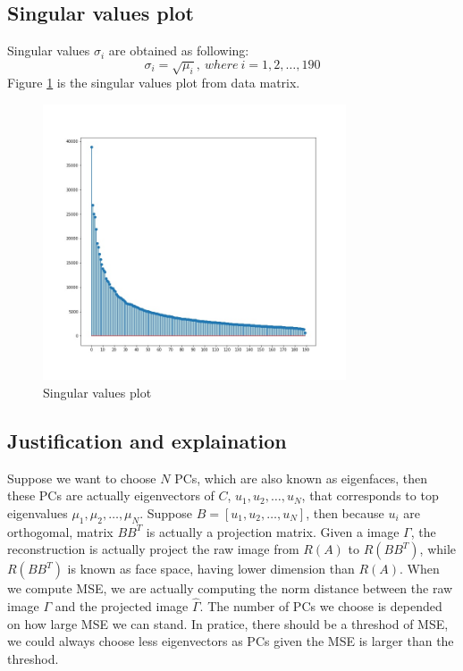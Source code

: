 \documentclass{article}
\begin{document}
\subsection{Singular values plot}
Singular values $\sigma_i$ are obtained as following:
\begin{equation}
  \sigma_i = \sqrt{\mu_i},\ where\ i=1,2,\ldots,190 \nonumber
\end{equation}
Figure \ref{fig:fig1} is the singular values plot from data matrix.
\begin{figure}[h]
  \centering
  \includegraphics[width=0.8\textwidth]{../image/eigenvalues_neutral.jpg}
  \caption{Singular values plot}
  \label{fig:fig1}
\end{figure}

\subsection{Justification and explaination}
Suppose we want to choose $N$ PCs, which are also known as eigenfaces, then these PCs are actually eigenvectors
of $C$, $u_1,u_2,\ldots,u_N$, that corresponds to top eigenvalues $\mu_1,\mu_2,\ldots,\mu_N$. Suppose
$B=[u_1,u_2,\ldots,u_N]$, then because $u_i$ are orthogomal, matrix $BB^T$ is actually a projection matrix.
Given a image $\Gamma$, the reconstruction is actually project the raw image from $R(A)$ to $R(BB^T)$, while
$R(BB^T)$ is known as face space, having lower dimension than $R(A)$. When we compute MSE, we are actually computing
the norm distance between the raw image $\Gamma$ and the projected image $\hat{\Gamma}$. The number of PCs we choose
is depended on how large MSE we can stand. In pratice, there should be a threshod of MSE, we could always choose less
eigenvectors as PCs given the MSE is larger than the threshod.\\
\end{document}
